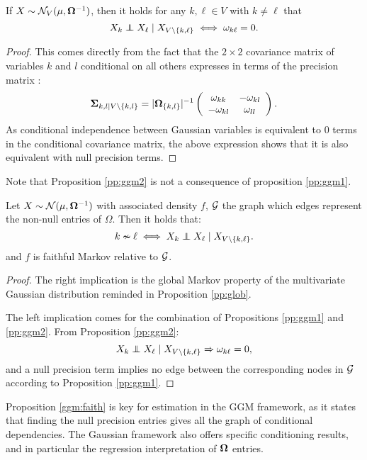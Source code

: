  \begin{prop}\label{pp:ggm2}If  $X\sim \mathcal{N}_V(\mu, {\boldsymbol{\Omega}}^{-1})$, then it holds for any $k,\ell\in V$ with $k\neq \ell$ that
$$X_k \independent X_\ell \mid X_{V\setminus\{k,\ell\}} \iff \omega_{k\ell}=0. $$
 \end{prop}
  \begin{proof}
  This comes directly from the fact that the $2\times 2$  covariance matrix of variables $k$ and $l$ conditional on all others expresses in terms of the precision matrix : $${\boldsymbol{\Sigma}}_{k,l\mid V\setminus\{k,l\}} = |{\boldsymbol{\Omega}}_{\{k,l\}}|^{-1} \left(\begin{array}{cc}
\omega_{kk} & -\omega_{kl}\\
-\omega_{kl} & \omega_{ll}  
  \end{array}\right).$$
  As conditional independence between Gaussian variables is equivalent to 0 terms in the conditional covariance matrix, the above expression shows that it is also equivalent with null precision terms.
  \end{proof}
  Note that Proposition \ref{pp:ggm2} is not a consequence of proposition \ref{pp:ggm1}.
\begin{prop}\label{ggm:faith}
 Let $X\sim \mathcal{N}(\mu, {\boldsymbol{\Omega}}^{-1})$ with associated density $f$, $\mathcal{G}$ the graph which edges represent the non-null entries of $\Omega$. Then  it holds that:
 $$k\nsim \ell \iff  X_k \independent X_\ell \mid X_{V\setminus\{k,\ell\}}. $$
 and $f$ is faithful Markov relative to $\mathcal{G}$.
\end{prop} 
\begin{proof}
The right implication is the global Markov property of the multivariate Gaussian distribution reminded in Proposition \ref{pp:glob}.

The left implication comes for the combination of Propositions \ref{pp:ggm1} and \ref{pp:ggm2}. From Proposition \ref{pp:ggm2}:
$$X_k \independent X_\ell \mid X_{V\setminus\{k,\ell\}} \Rightarrow \omega_{k\ell}=0,$$
and a null precision term implies no edge between the corresponding nodes in $\mathcal{G}$ according to  Proposition \ref{pp:ggm1}.
\end{proof}
Proposition \ref{ggm:faith} is key for estimation in the GGM framework, as it states that finding the null precision entries gives all the graph of conditional dependencies. The Gaussian framework also offers specific conditioning results, and in particular the regression interpretation of ${\boldsymbol{\Omega}}$ entries.

